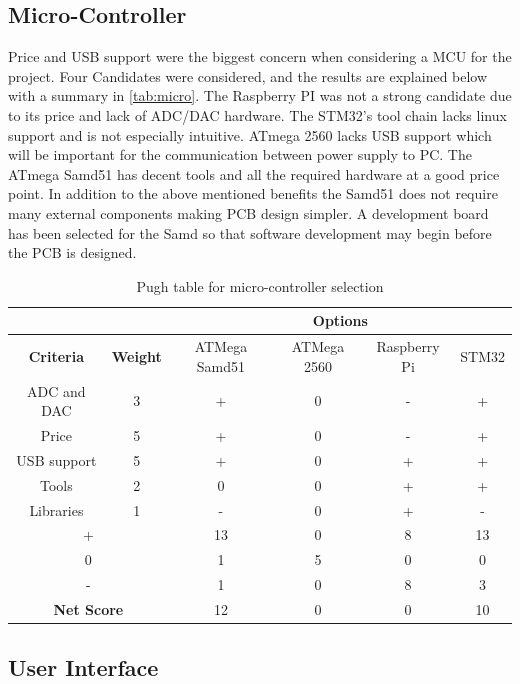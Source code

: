 \documentclass[12pt]{article}
\begin{document}
\subsection {Micro-Controller}
Price and USB support were the biggest concern when considering a MCU for the project. 
Four Candidates were considered, and the results are explained below with a summary in 
\autoref{tab:micro}.
The Raspberry PI was not a strong candidate due to its price and lack of ADC/DAC
hardware. The STM32’s tool chain lacks linux support and is not especially intuitive. 
ATmega 2560 lacks USB support which will be important for the communication between 
power supply to PC. The ATmega Samd51 has decent tools and all the required hardware 
at a good price point. In addition to the above mentioned benefits the Samd51 does 
not require many external components making PCB design simpler. A development board 
has been selected for the Samd so that software development may begin before the PCB 
is designed.\\ 
\begin{table}[H]
    \centering
\begin{tabular}{ |c|c||c|c|c|c|  }
    \cline{3-6}
    \multicolumn{1}{c}{}& \multicolumn{1}{c}{}&  \multicolumn{4}{|c|}{\textbf{Options}} \\
    \hline
    \textbf{Criteria} & \textbf{Weight} & ATMega Samd51 & ATMega 2560 & Raspberry Pi & STM32 \\ 
    \hline
    ADC and DAC & 3 & + & 0 & - & + \\
    Price & 5 & + & 0 & - & + \\
    USB support & 5 & + & 0 & + & + \\
    Tools & 2 & 0 & 0 & + & + \\
    Libraries & 1 & - & 0 & + & - \\ 
    \hline
    \hline
    \multicolumn{2}{|c||}{+} & 13 & 0 & 8 & 13\\
    \multicolumn{2}{|c||}{0} & 1 & 5 & 0 & 0\\
    \multicolumn{2}{|c||}{-} & 1 & 0 & 8 & 3\\
    \hline \hline
    \multicolumn{2}{|c||}{\textbf{Net Score}} & 12 & 0 & 0 & 10\\
    \hline
\end{tabular}
\caption{Pugh table for micro-controller selection }
\label{tab:micro}
\end{table}
\subsection{User Interface}
\end{document}
